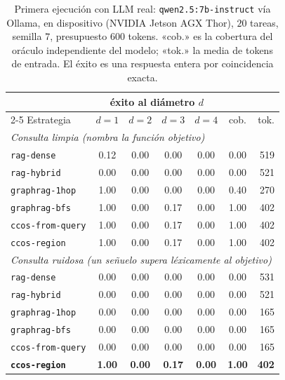 \documentclass[11pt]{article}
\newcommand{\code}[1]{\texttt{#1}}
\begin{document}
\begin{table}[h]
\centering
\begin{tabular}{lcccccr}
\toprule
& \multicolumn{4}{c}{éxito al diámetro $d$} & & \\
\cmidrule(lr){2-5}
Estrategia & $d{=}1$ & $d{=}2$ & $d{=}3$ & $d{=}4$ & cob. & tok. \\
\midrule
\multicolumn{7}{l}{\emph{Consulta limpia (nombra la función objetivo)}}\\
\code{rag-dense}      & 0.12 & 0.00 & 0.00 & 0.00 & 0.00 & 519 \\
\code{rag-hybrid}     & 0.00 & 0.00 & 0.00 & 0.00 & 0.00 & 521 \\
\code{graphrag-1hop}  & 1.00 & 0.00 & 0.00 & 0.00 & 0.40 & 270 \\
\code{graphrag-bfs}   & 1.00 & 0.00 & 0.17 & 0.00 & 1.00 & 402 \\
\code{ccos-from-query}& 1.00 & 0.00 & 0.17 & 0.00 & 1.00 & 402 \\
\code{ccos-region}    & 1.00 & 0.00 & 0.17 & 0.00 & 1.00 & 402 \\
\midrule
\multicolumn{7}{l}{\emph{Consulta ruidosa (un señuelo supera léxicamente al objetivo)}}\\
\code{rag-dense}      & 0.00 & 0.00 & 0.00 & 0.00 & 0.00 & 531 \\
\code{rag-hybrid}     & 0.00 & 0.00 & 0.00 & 0.00 & 0.00 & 521 \\
\code{graphrag-1hop}  & 0.00 & 0.00 & 0.00 & 0.00 & 0.00 & 165 \\
\code{graphrag-bfs}   & 0.00 & 0.00 & 0.00 & 0.00 & 0.00 & 165 \\
\code{ccos-from-query}& 0.00 & 0.00 & 0.00 & 0.00 & 0.00 & 165 \\
\textbf{\code{ccos-region}} & \textbf{1.00} & \textbf{0.00} & \textbf{0.17} & \textbf{0.00} & \textbf{1.00} & \textbf{402} \\
\bottomrule
\end{tabular}
\caption{Primera ejecución con LLM real: \code{qwen2.5:7b-instruct} vía Ollama, en
dispositivo (NVIDIA Jetson AGX Thor), $20$ tareas, semilla $7$, presupuesto $600$
tokens. «cob.» es la cobertura del oráculo independiente del modelo; «tok.» la media de
tokens de entrada. El éxito es una respuesta entera por coincidencia exacta.}
\label{tab:real}
\end{table}
\end{document}
